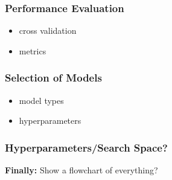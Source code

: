 \subsubsection{Performance Evaluation}
\begin{itemize}[noitemsep]
	\item cross validation
	\item metrics
\end{itemize}



\subsubsection{Selection of Models}

\begin{itemize}[noitemsep]
	\item model types
	\item hyperparameters
\end{itemize}

\subsubsection{Hyperparameters/Search Space?}


\textbf{Finally:} Show a flowchart of everything?






